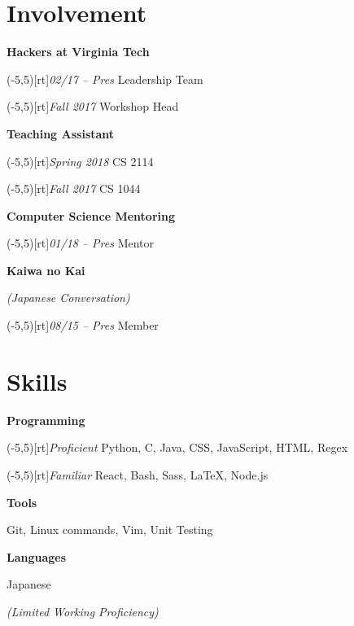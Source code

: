 \documentclass[9pt]{extarticle}
\newcommand{\sidebox}[1]{\makebox(-5,5)[rt]{#1}}
\newcommand{\sidenote}[1]{\scriptsize\color{setting}\textit{#1}}
\newcommand{\Subsection}[2]{
    {\normalsize\color{subsection}\textbf{#1}}
    \begin{trivlist}
        \color{bullet}
        #2
    \end{trivlist}
}
\newcommand{\ChronoItem}[2]{
    \item {%
        \sidebox{\sidenote{#2}}%
        \color{bullet}#1
    }
}
\newcommand{\InfoItem}[1]{
    \item {%
        \color{info}\textit{(#1)}
    }
}
\newcommand{\vsubspace}{\vspace{1.5em}}
\newcommand{\vsmallspace}{\vspace{1em}}
\newcommand{\vrightspace}{\vfill}
\begin{document}
\begin{paracol}{2}
\begin{rightcolumn}
        \section{Involvement}
            \Subsection{Hackers at Virginia Tech}{
                \ChronoItem{Leadership Team}{02/17 – Pres}
                \ChronoItem{Workshop Head}{Fall 2017}
            }
            \vsmallspace
            \Subsection{Teaching Assistant}{
                \ChronoItem{CS 2114}{Spring 2018}
                \ChronoItem{CS 1044}{Fall 2017}
            }
            \vsmallspace
            \Subsection{Computer Science Mentoring}{
                \ChronoItem{Mentor}{01/18 – Pres}
            }
            \vsmallspace
            \Subsection{Kaiwa no Kai}{
                \InfoItem{Japanese Conversation}
                \ChronoItem{Member}{08/15 – Pres}
            }
        \vrightspace
        \section{Skills}
            \Subsection{Programming}{
                \ChronoItem{Python, C, Java, CSS, JavaScript, HTML, Regex}{Proficient}
                \ChronoItem{React, Bash, Sass, LaTeX, Node.js}{Familiar}
            }
            \vsubspace
            \Subsection{Tools}{
                \item Git, Linux commands, Vim, Unit Testing
            }
            \vsubspace
            \Subsection{Languages}{
                \item Japanese
                \InfoItem{Limited Working Proficiency}
            }
    \end{rightcolumn}
\end{paracol}
\end{document}
